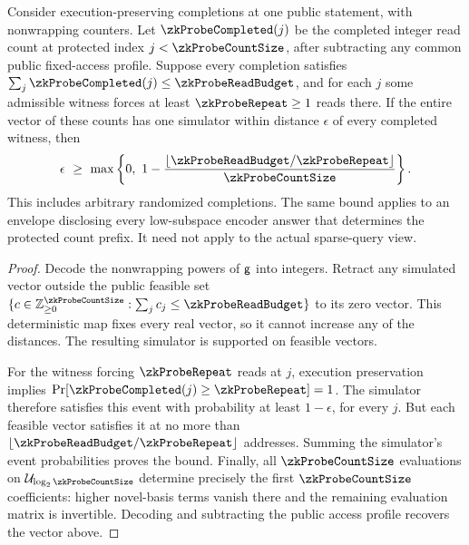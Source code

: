 \begin{proposition}\label{prop:zk-count-prefix-budget}
Consider execution-preserving completions at one public statement, with nonwrapping counters. Let $\zkProbeCompleted(j)$ be the completed integer read count at protected index $j<\zkProbeCountSize$, after subtracting any common public fixed-access profile. Suppose every completion satisfies $\sum_j\zkProbeCompleted(j)\le\zkProbeReadBudget$, and for each $j$ some admissible witness forces at least $\zkProbeRepeat\ge1$ reads there. If the entire vector of these counts has one simulator within distance $\epsilon$ of every completed witness, then
\[
 \epsilon\ \ge\ \max\left\{0,\ 1-
 \frac{\lfloor\zkProbeReadBudget/\zkProbeRepeat\rfloor}{\zkProbeCountSize}\right\}.
\]
This includes arbitrary randomized completions. The same bound applies to an envelope disclosing every low-subspace encoder answer that determines the protected count prefix. It need not apply to the actual sparse-query view.
\end{proposition}
\begin{proof}
Decode the nonwrapping powers of $\mathsf{g}$ into integers. Retract any simulated vector outside the public feasible set $\{c\in\mathbb Z_{\ge0}^{\zkProbeCountSize}:\sum_jc_j\le\zkProbeReadBudget\}$ to its zero vector. This deterministic map fixes every real vector, so it cannot increase any of the distances. The resulting simulator is supported on feasible vectors.

For the witness forcing $\zkProbeRepeat$ reads at $j$, execution preservation implies $\Pr[\zkProbeCompleted(j)\ge\zkProbeRepeat]=1$. The simulator therefore satisfies this event with probability at least $1-\epsilon$, for every $j$. But each feasible vector satisfies it at no more than $\lfloor\zkProbeReadBudget/\zkProbeRepeat\rfloor$ addresses. Summing the simulator's event probabilities proves the bound. Finally, all $\zkProbeCountSize$ evaluations on $\subsp_{\log_2\zkProbeCountSize}$ determine precisely the first $\zkProbeCountSize$ coefficients: higher novel-basis terms vanish there and the remaining evaluation matrix is invertible. Decoding and subtracting the public access profile recovers the vector above.
\end{proof}

